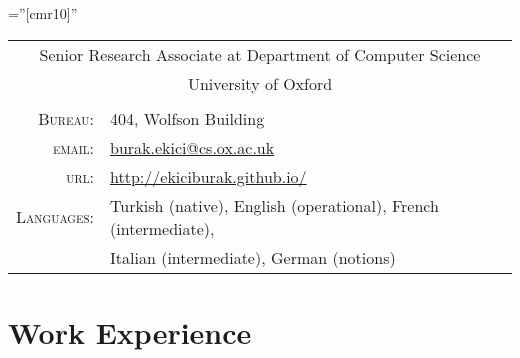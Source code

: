 \documentclass[a4paper,9pt]{article} %
\begin{document}
\pagestyle{empty} %

\font\fb=''[cmr10]'' %


\par{\bigskip\par} %
{\vskip-3mm}

\begin{tabular}{rl}
\multicolumn{2}{c}{{\large Senior Research Associate at Department of Computer Science}}\\
\multicolumn{2}{c}{{\large University of Oxford}}\\ \\
\textsc{Bureau:} & 404, Wolfson Building\\
\textsc{email:} & \href{mailto:burak.ekici@cs.ox.ac.uk}{burak.ekici@cs.ox.ac.uk}\\
\textsc{url:} & \href{http://ekiciburak.github.io/}{http://ekiciburak.github.io/}\\
\textsc{Languages:} & Turkish (native), English (operational), French (intermediate),\\
& Italian (intermediate), German (notions)
\end{tabular}


\section{Work Experience}
\end{document}
